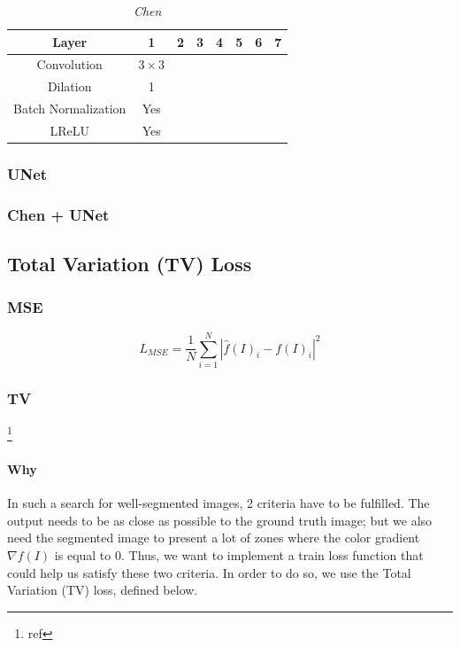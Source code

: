 \documentclass{article}
\begin{document}
            \begin{table}[!ht]
                \centering
                \begin{tabular}{|c|c|c|c|c|c|c|c|}
                    \hline
                    Layer & 1 & 2 & 3 & 4 & 5 & 6 & 7\\
                    \hline \hline
                    Convolution & $3\times3$ & & & & & & \\
                    \hline
                    Dilation & 1 & & & & & & \\
                    \hline
                    Batch Normalization & Yes & & & & & & \\
                    \hline
                    LReLU & Yes & & & & & & \\
                    \hline
                \end{tabular}
                \caption{\textit{Chen}}
            \end{table}

        \subsubsection{UNet}
        \subsubsection{Chen + UNet}

    \subsection{Total Variation (TV) Loss}
        \subsubsection{MSE}
        $$L_{MSE}=\frac{1}{N}\sum_{i=1}^N |\hat{f}(I)_i-f(I)_i|^2$$

        \subsubsection{TV}\footnote{ref}
            \paragraph{Why} In such a search for well-segmented images, 2 criteria have to be fulfilled. The output needs to be as close as possible to the ground truth image; but we also need the segmented image to present a lot of zones where the color gradient $\nabla f(I)$ is equal to $0$. Thus, we want to implement a train loss function that could help us satisfy these two criteria.
            In order to do so, we use the Total Variation (TV) loss, defined below.
\end{document}
